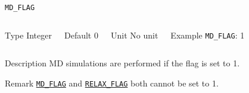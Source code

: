 \documentclass[xcolor=dvipsnames,t]{beamer}
\begin{document}
\begin{frame}[allowframebreaks]{\texttt{MD\_FLAG}} \label{MD_FLAG}
\vspace*{-12pt}
\begin{columns}
\begin{block}{Type}
Integer
\end{block}

\begin{block}{Default}
0
\end{block}

\begin{block}{Unit}
No unit
\end{block}

\begin{block}{Example}
\texttt{MD\_FLAG}: 1
\end{block}
\end{columns}

\begin{block}{Description}
MD simulations are performed if the flag is set to 1.
\end{block}

\begin{block}{Remark}
\hyperlink{MD_FLAG}{\texttt{MD\_FLAG}} and \hyperlink{RELAX_FLAG}{\texttt{RELAX\_FLAG}} both cannot be set to 1. 
\end{block}

\end{frame}
\end{document}
